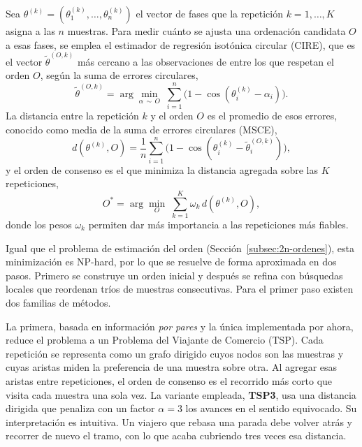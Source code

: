 \documentclass[12pt, a4paper]{report}
\begin{document}
Sea $\theta^{(k)}=(\theta^{(k)}_1,\dots,\theta^{(k)}_n)$ el vector de fases que la repetición $k=1,\dots,K$ asigna a las $n$ muestras. Para medir cuánto se ajusta una ordenación candidata $O$ a esas fases, se emplea el estimador de regresión isotónica circular (CIRE), que es el vector $\tilde\theta^{(O,k)}$ más cercano a las observaciones de entre los que respetan el orden $O$, según la suma de errores circulares,
\begin{equation}
    \tilde\theta^{(O,k)} = \arg\min_{\alpha\,\sim\, O}\;\sum_{i=1}^{n}\big(1-\cos(\theta^{(k)}_i-\alpha_i)\big).
    \label{eq:cire}
\end{equation}
La distancia entre la repetición $k$ y el orden $O$ es el promedio de esos errores, conocido como media de la suma de errores circulares (MSCE),
\begin{equation}
    d(\theta^{(k)},O)=\frac{1}{n}\sum_{i=1}^{n}\big(1-\cos(\theta^{(k)}_i-\tilde\theta^{(O,k)}_i)\big),
    \label{eq:msce}
\end{equation}
y el orden de consenso es el que minimiza la distancia agregada sobre las $K$ repeticiones,
\begin{equation}
    O^* = \arg\min_{O}\;\sum_{k=1}^{K}\omega_k\,d(\theta^{(k)},O),
    \label{eq:consenso}
\end{equation}
donde los pesos $\omega_k$ permiten dar más importancia a las repeticiones más fiables.

Igual que el problema de estimación del orden (Sección~\ref{subsec:2n-ordenes}), esta minimización es NP-hard, por lo que se resuelve de forma aproximada en dos pasos. Primero se construye un orden inicial y después se refina con búsquedas locales que reordenan tríos de muestras consecutivas. Para el primer paso existen dos familias de métodos.

La primera, basada en información \emph{por pares} y la única implementada por ahora, reduce el problema a un Problema del Viajante de Comercio (TSP). Cada repetición se representa como un grafo dirigido cuyos nodos son las muestras y cuyas aristas miden la preferencia de una muestra sobre otra. Al agregar esas aristas entre repeticiones, el orden de consenso es el recorrido más corto que visita cada muestra una sola vez. La variante empleada, \textbf{TSP3}, usa una distancia dirigida que penaliza con un factor $\alpha=3$ los avances en el sentido equivocado. Su interpretación es intuitiva. Un viajero que rebasa una parada debe volver atrás y recorrer de nuevo el tramo, con lo que acaba cubriendo tres veces esa distancia.
\end{document}
